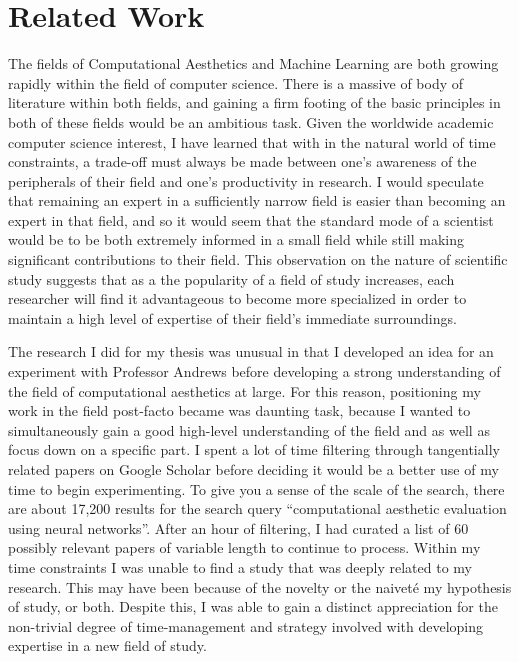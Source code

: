 \documentclass[midd]{thesis}
\begin{document}
\chapter{Related Work}

The fields of Computational Aesthetics and Machine Learning are both growing rapidly within the field of computer science. There is a massive of body of literature within both fields, and gaining a firm footing of the basic principles in both of these fields would be an ambitious task. Given the worldwide academic computer science interest, I have learned that with in the natural world of time constraints, a trade-off must always be made between one's awareness of the peripherals of their field and one's productivity in research. I would speculate that remaining an expert in a sufficiently narrow field is easier than becoming an expert in that field, and so it would seem that the standard mode of a scientist would be to be both extremely informed in a small field while still making significant contributions to their field. This observation on the nature of scientific study suggests that as a the popularity of a field of study increases, each researcher will find it advantageous to become more specialized in order to maintain a high level of expertise of their field's immediate surroundings.

The research I did for my thesis was unusual in that I developed an idea for an experiment with Professor Andrews before developing a strong understanding of the field of computational aesthetics at large. For this reason, positioning my work in the field post-facto became was daunting task, because I wanted to simultaneously gain a good high-level understanding of the field and as well as focus down on a specific part. I spent a lot of time filtering through tangentially related papers on Google Scholar before deciding it would be a better use of my time to begin experimenting. To give you a sense of the scale of the search, there are about 17,200 results for the search query ``computational aesthetic evaluation using neural networks''. After an hour of filtering, I had curated a list of 60 possibly relevant papers of variable length to continue to process. Within my time constraints I was unable to find a study that was deeply related to my research. This may have been because of the novelty or the naivet\'{e} my hypothesis of study, or both. Despite this, I was able to gain a distinct appreciation for the non-trivial degree of time-management and strategy involved with developing expertise in a new field of study.
\end{document}
